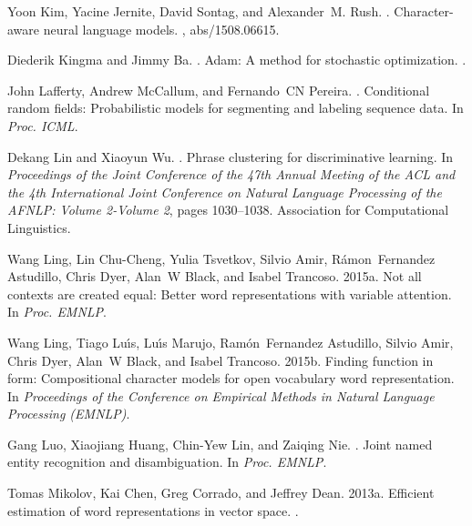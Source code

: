 \documentclass[11pt,letterpaper]{article}
\begin{document}
\begin{thebibliography}{}
Yoon Kim, Yacine Jernite, David Sontag, and Alexander~M. Rush.
.
\newblock Character-aware neural language models.
, abs/1508.06615.

Diederik Kingma and Jimmy Ba.
.
\newblock Adam: A method for stochastic optimization.
.

John Lafferty, Andrew McCallum, and Fernando~CN Pereira.
.
\newblock Conditional random fields: Probabilistic models for segmenting and
  labeling sequence data.
\newblock In {\em Proc. ICML}.

Dekang Lin and Xiaoyun Wu.
.
\newblock Phrase clustering for discriminative learning.
\newblock In {\em Proceedings of the Joint Conference of the 47th Annual
  Meeting of the ACL and the 4th International Joint Conference on Natural
  Language Processing of the AFNLP: Volume 2-Volume 2}, pages 1030--1038.
  Association for Computational Linguistics.

Wang Ling, Lin Chu-Cheng, Yulia Tsvetkov, Silvio Amir, R{\'a}mon~Fernandez
  Astudillo, Chris Dyer, Alan~W Black, and Isabel Trancoso.
\newblock 2015a.
\newblock Not all contexts are created equal: Better word representations with
  variable attention.
\newblock In {\em Proc. EMNLP}.

Wang Ling, Tiago Lu\'{\i}s, Lu\'{\i}s Marujo, Ram\'on~Fernandez Astudillo,
  Silvio Amir, Chris Dyer, Alan~W Black, and Isabel Trancoso.
\newblock 2015b.
\newblock Finding function in form: Compositional character models for open
  vocabulary word representation.
\newblock In {\em {Proceedings of the Conference on Empirical Methods in
  Natural Language Processing (EMNLP)}}.

Gang Luo, Xiaojiang Huang, Chin-Yew Lin, and Zaiqing Nie.
.
\newblock Joint named entity recognition and disambiguation.
\newblock In {\em Proc. EMNLP}.

Tomas Mikolov, Kai Chen, Greg Corrado, and Jeffrey Dean.
\newblock 2013a.
\newblock Efficient estimation of word representations in vector space.
.


\end{thebibliography}
\end{document}
